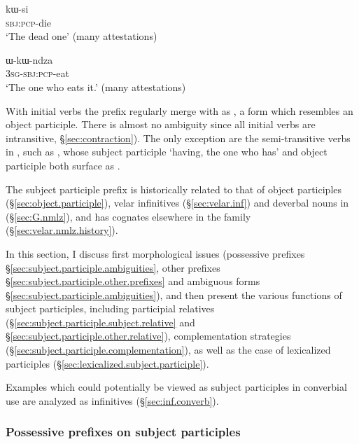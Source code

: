  \begin{exe}
\ex \label{ex:kWsi}
\gll kɯ-si  \\
  \textsc{sbj}:\textsc{pcp}-die \\
 \glt  `The dead one' (many attestations)
\end{exe}

 \begin{exe} 
\ex \label{ex:WkWndza}
\gll ɯ-kɯ-ndza \\
  \textsc{3sg}-\textsc{sbj}:\textsc{pcp}-eat \\
 \glt  `The one who eats it.' (many attestations)
\end{exe}

With  initial verbs the  prefix regularly merge with  as , a form which resembles an object participle. There is almost no ambiguity since all  initial verbs are intransitive, §\ref{sec:contraction}). The only exception are the semi-transitive verbs in , such as , whose subject participle  `having, the one who has' and object participle  both surface as .

The subject participle  prefix is historically related to that of object participles (§\ref{sec:object.participle}), velar infinitives (§\ref{sec:velar.inf}) and deverbal nouns in  (§\ref{sec:G.nmlz}), and has cognates elsewhere in the family (§\ref{sec:velar.nmlz.history}).

In this section, I discuss first morphological issues (possessive prefixes §\ref{sec:subject.participle.ambiguities}, other prefixes §\ref{sec:subject.participle.other.prefixes} and ambiguous forms §\ref{sec:subject.participle.ambiguities}), and then present the various functions of subject participles, including participial relatives (§\ref{sec:subject.participle.subject.relative} and §\ref{sec:subject.participle.other.relative}), complementation strategies (§\ref{sec:subject.participle.complementation}), as well as the case of lexicalized participles (§\ref{sec:lexicalized.subject.participle}).
 
Examples which could potentially be viewed as subject participles in converbial use are analyzed as  infinitives (§\ref{sec:inf.converb}).

\subsubsection{Possessive prefixes on subject participles}  \label{sec:subject.participle.possessive}

